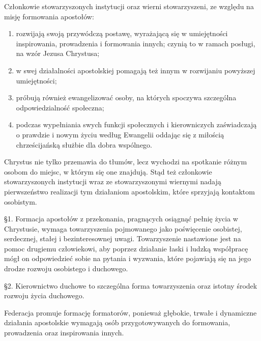 

 Członkowie stowarzyszonych instytucji oraz wierni stowarzyszeni, ze względu na misję formowania apostołów:


\begin{enumerate}


\item rozwijają swoją przywódczą postawę, wyrażającą się w umiejętności inspirowania, prowadzenia i formowania innych; czynią to w ramach posługi, na wzór Jezusa Chrystusa;


\item w swej działalności apostolskiej pomagają też innym w rozwijaniu powyższej umiejętności;


\item próbują również ewangelizować osoby, na których spoczywa szczególna odpowiedzialność społeczna;


\item podczas wypełniania swych funkcji społecznych i kierowniczych zaświadczają o prawdzie i nowym życiu według Ewangelii oddając się z miłością chrześcijańską służbie dla dobra wspólnego. 


\end{enumerate}
 
 
 Chrystus nie tylko przemawia do tłumów, lecz wychodzi na spotkanie różnym osobom do miejsc, w którym się one znajdują. Stąd też członkowie stowarzyszonych instytucji wraz ze stowarzyszonymi wiernymi nadają pierwszeństwo realizacji tym działaniom  apostolskim, które sprzyjają kontaktom osobistym.




 \S{}1. Formacja apostołów z przekonania, pragnących osiągnąć pełnię życia w Chrystusie, wymaga towarzyszenia pojmowanego jako poświęcenie osobistej, serdecznej, stałej i bezinteresownej uwagi. Towarzyszenie nastawione jest na pomoc drugiemu człowiekowi, aby poprzez działanie łaski i ludzką współpracę mógł on odpowiedzieć sobie na pytania i wyzwania, które pojawiają się na jego drodze rozwoju osobistego i duchowego.


\S{}2. Kierownictwo duchowe to szczególna forma towarzyszenia oraz istotny środek rozwoju życia duchowego.
 
 
 Federacja promuje formację formatorów, ponieważ głębokie, trwałe i dynamiczne działania apostolskie wymagają osób przygotowywanych do formowania, prowadzenia oraz inspirowania innych.
 
